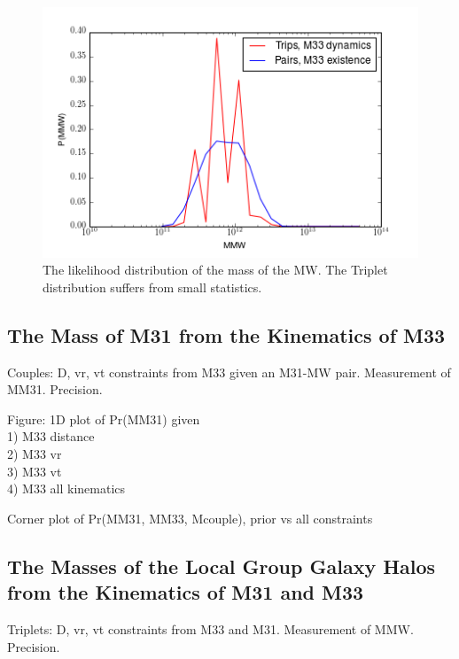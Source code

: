 \documentclass[iop,apj]{emulateapj}
\begin{document}
\begin{figure}
\includegraphics[width=\linewidth]{plots/pdf_mw_plot.png}
  \caption{The likelihood distribution of the mass of the MW. The Triplet distribution suffers from small statistics.}
  \label{fig:mw_pdf}
\end{figure}


\subsection{The Mass of M31 from the Kinematics of M33}
\label{sec:results:M31mass}

Couples: D, vr, vt constraints from M33 given an M31-MW pair. 
Measurement of  MM31. Precision. 

Figure: 1D plot of Pr(MM31) given \\
  1) M33 distance\\
  2) M33 vr\\
  3) M33 vt\\
  4) M33 all kinematics

Corner plot of Pr(MM31, MM33, Mcouple), prior vs all constraints


\subsection{The Masses of the Local Group Galaxy Halos from the Kinematics of M31 and M33}
\label{sec:results:jointanalysis}

Triplets: D, vr, vt constraints from M33 and M31. 
Measurement of MMW. Precision. 
\end{document}
